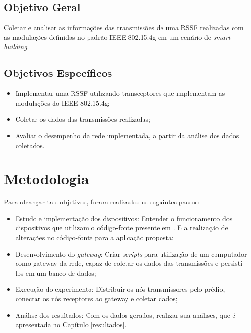 \subsection{Objetivo Geral}
\label{subsec:objGeral}
Coletar e analisar as informações das transmissões de uma RSSF realizadas com as modulações definidas no padrão IEEE 802.15.4g em um cenário de \emph{smart building}.


\subsection{Objetivos Específicos}
\label{subsec:objespecificos}
\begin{itemize}
      \item Implementar uma RSSF utilizando transceptores que implementam as modulações do IEEE 802.15.4g;
      \item Coletar os dados das transmissões realizadas;
      \item Avaliar o desempenho da rede implementada, a partir da análise dos dados coletados.
\end{itemize}


\section{Metodologia}
\label{sec:metodologia}
Para alcançar tais objetivos, foram realizados os seguintes passos:


\begin{itemize}
      \item Estudo e implementação dos dispositivos: Entender o funcionamento dos dispositivos que utilizam o código-fonte presente em \cite{openmoteb-firmware}. E a realização de alterações no código-fonte para a aplicação proposta;
      \item Desenvolvimento do \emph{gateway}: Criar \emph{scripts} para utilização de um computador como gateway da rede, capaz de coletar os dados das transmissões e persisti-los em um banco de dados;
      \item Execução do experimento: Distribuir os nós transmissores pelo prédio, conectar os nós receptores ao gateway e coletar dados;
      \item Análise dos resultados: Com os dados gerados, realizar sua análises, que é apresentada no Capítulo \ref{resultados}.
\end{itemize}